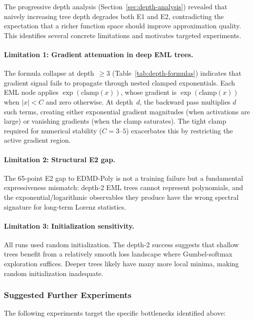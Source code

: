 \documentclass[11pt]{article}
\begin{document}
The progressive depth analysis (Section~\ref{sec:depth-analysis}) revealed
that naively increasing tree depth degrades both E1 and E2, contradicting the
expectation that a richer function space should improve approximation quality.
This identifies several concrete limitations and motivates targeted
experiments.

\paragraph{Limitation 1: Gradient attenuation in deep EML trees.}
The formula collapse at depth~$\ge 3$ (Table~\ref{tab:depth-formulas})
indicates that gradient signal fails to propagate through nested clamped
exponentials.  Each EML node applies $\exp(\text{clamp}(x))$, whose gradient is
$\exp(\text{clamp}(x))$ when $|x| < C$ and zero otherwise.  At depth~$d$,
the backward pass multiplies $d$ such terms, creating either exponential
gradient magnitudes (when activations are large) or vanishing gradients (when
the clamp saturates).  The tight clamp required for numerical stability
($C\!=\!3$--$5$) exacerbates this by restricting the active gradient region.

\paragraph{Limitation 2: Structural E2 gap.}
The 65-point E2 gap to EDMD-Poly is not a training failure but a fundamental
expressiveness mismatch: depth-2 EML trees cannot represent polynomials, and the
exponential/logarithmic observables they produce have the wrong spectral
signature for long-term Lorenz statistics.

\paragraph{Limitation 3: Initialization sensitivity.}
All runs used random initialization.  The depth-2 success suggests that shallow
trees benefit from a relatively smooth loss landscape where Gumbel-softmax
exploration suffices.  Deeper trees likely have many more local minima,
making random initialization inadequate.

\subsubsection{Suggested Further Experiments}

The following experiments target the specific bottlenecks identified above:
\end{document}

